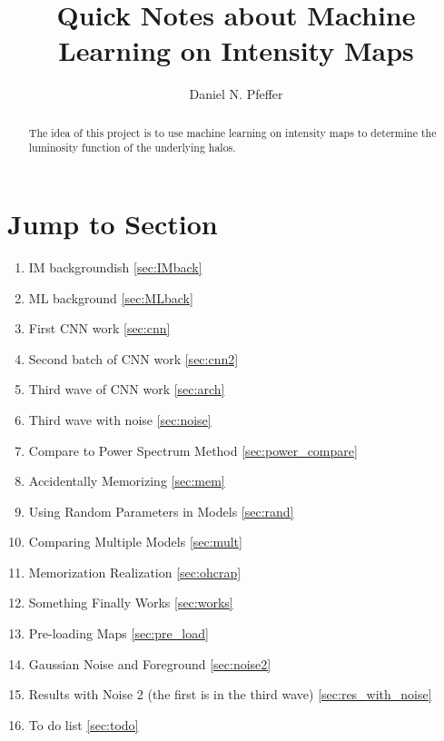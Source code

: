 \documentclass{article}
\title{Quick Notes about Machine Learning on Intensity Maps}
\author{Daniel N. Pfeffer}
\date{}
\begin{document}
% 

	\maketitle

	\begin{abstract}
		The idea of this project is to use machine learning on intensity maps to determine the luminosity function of the underlying halos.
	\end{abstract}

	\section{Jump to Section}
		\begin{enumerate}
			\item IM backgroundish \ref{sec:IMback}

			\item ML background \ref{sec:MLback}

			\item First CNN work \ref{sec:cnn}

			\item Second batch of CNN work \ref{sec:cnn2}

			\item Third wave of CNN work \ref{sec:arch}

			\item Third wave with noise \ref{sec:noise}

			\item Compare to Power Spectrum Method \ref{sec:power_compare}

			\item Accidentally Memorizing \ref{sec:mem}

			\item Using Random Parameters in Models \ref{sec:rand}

			\item Comparing Multiple Models \ref{sec:mult}

			\item Memorization Realization \ref{sec:ohcrap}

			\item Something Finally Works \ref{sec:works}

			\item Pre-loading Maps \ref{sec:pre_load}

			\item Gaussian Noise and Foreground \ref{sec:noise2}

			\item Results with Noise 2 (the first is in the third wave) \ref{sec:res_with_noise}

			\item To do list \ref{sec:todo}
		\end{enumerate}	
\end{document}
